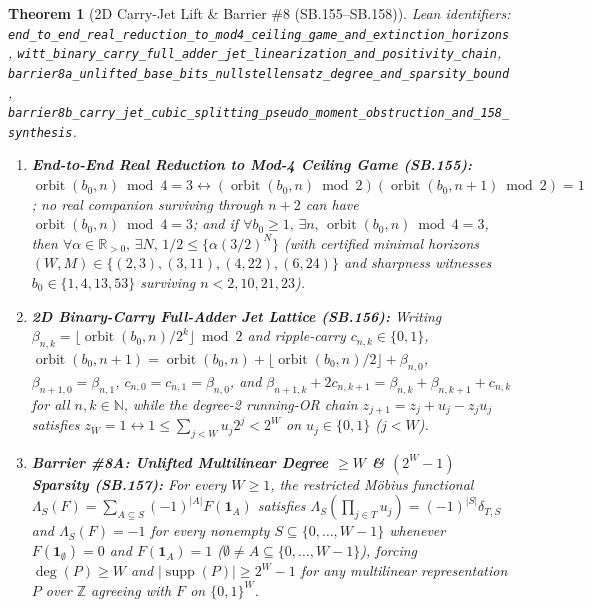 \documentclass[11pt]{article}
\newtheorem{theorem}{Theorem}[section]
\begin{document}
\begin{theorem}[2D Carry-Jet Lift \& Barrier \#8 (SB.155--SB.158)]
\emph{Lean identifiers:} \nolinkurl{end_to_end_real_reduction_to_mod4_ceiling_game_and_extinction_horizons}, \nolinkurl{witt_binary_carry_full_adder_jet_linearization_and_positivity_chain}, \nolinkurl{barrier8a_unlifted_base_bits_nullstellensatz_degree_and_sparsity_bound}, \nolinkurl{barrier8b_carry_jet_cubic_splitting_pseudo_moment_obstruction_and_158_synthesis}.
\begin{enumerate}
  \item \textbf{End-to-End Real Reduction to Mod-4 Ceiling Game (SB.155):} $\operatorname{orbit}(b_0, n) \bmod 4 = 3 \leftrightarrow (\operatorname{orbit}(b_0, n) \bmod 2)(\operatorname{orbit}(b_0, n+1) \bmod 2) = 1$; no real companion surviving through $n + 2$ can have $\operatorname{orbit}(b_0, n) \bmod 4 = 3$; and if $\forall b_0 \ge 1,\, \exists n,\, \operatorname{orbit}(b_0, n) \bmod 4 = 3$, then $\forall \alpha \in \mathbb{R}_{>0},\, \exists N,\, 1/2 \le \{\alpha(3/2)^N\}$ (with certified minimal horizons $(W, M) \in \{(2, 3), (3, 11), (4, 22), (6, 24)\}$ and sharpness witnesses $b_0 \in \{1, 4, 13, 53\}$ surviving $n < 2, 10, 21, 23$).
  \item \textbf{2D Binary-Carry Full-Adder Jet Lattice (SB.156):} Writing $\beta_{n,k} = \lfloor \operatorname{orbit}(b_0,n)/2^k \rfloor \bmod 2$ and ripple-carry $c_{n,k} \in \{0,1\}$, $\operatorname{orbit}(b_0, n+1) = \operatorname{orbit}(b_0,n) + \lfloor \operatorname{orbit}(b_0,n)/2 \rfloor + \beta_{n,0}$, $\beta_{n+1,0} = \beta_{n,1}$, $c_{n,0} = c_{n,1} = \beta_{n,0}$, and $\beta_{n+1,k} + 2 c_{n,k+1} = \beta_{n,k} + \beta_{n,k+1} + c_{n,k}$ for all $n, k \in \mathbb{N}$, while the degree-2 running-OR chain $z_{j+1} = z_j + u_j - z_j u_j$ satisfies $z_W = 1 \leftrightarrow 1 \le \sum_{j<W} u_j 2^j < 2^W$ on $u_j \in \{0,1\}$ ($j < W$).
  \item \textbf{Barrier \#8A: Unlifted Multilinear Degree $\ge W$ \& $(2^W - 1)$ Sparsity (SB.157):} For every $W \ge 1$, the restricted M\"obius functional $\Lambda_S(F) = \sum_{A \subseteq S} (-1)^{|A|} F(\mathbf{1}_A)$ satisfies $\Lambda_S(\prod_{j \in T} u_j) = (-1)^{|S|} \delta_{T,S}$ and $\Lambda_S(F) = -1$ for every nonempty $S \subseteq \{0,\dots,W-1\}$ whenever $F(\mathbf{1}_\emptyset) = 0$ and $F(\mathbf{1}_A) = 1$ ($\emptyset \ne A \subseteq \{0,\dots,W-1\}$), forcing $\deg(P) \ge W$ and $|\operatorname{supp}(P)| \ge 2^W - 1$ for any multilinear representation $P$ over $\mathbb{Z}$ agreeing with $F$ on $\{0,1\}^W$.

\end{enumerate}
\end{theorem}
\end{document}
